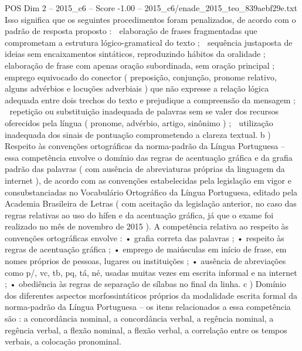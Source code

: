 \begin{textsample}{POS Dim 2 – 2015\_c6 – Score -1.00 – 2015\_c6/enade\_2015\_teo\_839aebf29e.txt}
Isso significa que os seguintes procedimentos foram penalizados, de acordo com o padrão de resposta proposto :  elaboração de frases fragmentadas que comprometam a estrutura lógico-gramatical do texto ;  sequência justaposta de ideias sem encaixamentos sintáticos, reproduzindo hábitos da oralidade ;  elaboração de frase com apenas oração subordinada, sem oração principal ;  emprego equivocado do conector ( preposição, conjunção, pronome relativo, alguns advérbios e locuções adverbiais ) que não expresse a relação lógica adequada entre dois trechos do texto e prejudique a compreensão da mensagem ;  repetição ou substituição inadequada de palavras sem se valer dos recursos oferecidos pela língua ( pronome, advérbio, artigo, sinônimo ) ;  utilização inadequada dos sinais de pontuação comprometendo a clareza textual. b ) Respeito às convenções ortográficas da norma-padrão da Língua Portuguesa – essa competência envolve o domínio das regras de acentuação gráfica e da grafia padrão das palavras ( com ausência de abreviaturas próprias da linguagem da internet ), de acordo com as convenções estabelecidas pela legislação em vigor e consubstanciadas no Vocabulário Ortográfico da Língua Portuguesa, editado pela Academia Brasileira de Letras ( com aceitação da legislação anterior, no caso das regras relativas ao uso do hífen e da acentuação gráfica, já que o exame foi realizado no mês de novembro de 2015 ).
A competência relativa ao respeito às convenções ortográficas envolve : • grafia correta das palavras ; • respeito às regras de acentuação gráfica ; • emprego de maiúsculas em início de frase, em nomes próprios de pessoas, lugares ou instituições ; • ausência de abreviações como p/, vc, tb, pq, tá, né, usadas muitas vezes em escrita informal e na internet ; • obediência às regras de separação de sílabas no final da linha. c ) Domínio dos diferentes aspectos morfossintáticos próprios da modalidade escrita formal da norma-padrão da Língua Portuguesa – os itens relacionados a essa competência são : a concordância nominal, a concordância verbal, a regência nominal, a regência verbal, a flexão nominal, a flexão verbal, a correlação entre os tempos verbais, a colocação pronominal.

\end{textsample}
